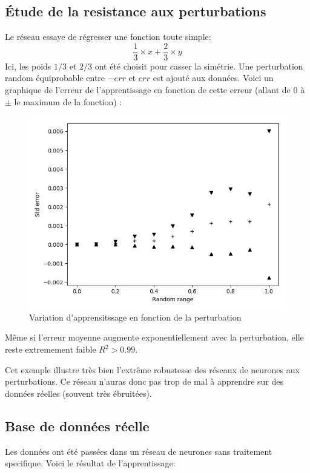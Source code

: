 \subsection{Étude de la resistance aux perturbations}\label{subsec:random}
Le réseau essaye de régresser une fonction toute simple:
\begin{equation}
    \frac{1}{3} \times x + \frac{2}{3} \times y
\end{equation}
Ici, les poids $1/3$ et $2/3$ ont été choisit pour casser la simétrie.
Une perturbation random équiprobable entre $-err$ et $err$ est ajouté aux données.
Voici un graphique de l'erreur de l'apprentissage en fonction de cette erreur
(allant de $0$ à $\pm$ le maximum de la fonction) :
\begin{figure}[H]
    \center
    \includegraphics[height=\moyen]{pict/random.png}
	\caption{Variation d'apprensitssage en fonction de la perturbation}
	\label{fig:obj2tiers1}
\end{figure}

Même si l'erreur moyenne augmente exponentiellement avec la perturbation,
elle reste extremement faible $R^2 > 0.99$.

Cet exemple illustre très bien l'extrême robustesse des réseaux de neurones aux perturbations.
Ce réseau n'auras donc pas trop de mal à apprendre sur des données réelles (souvent très ébruitées).


\subsection{Base de données réelle}\label{subsec:real}
Les données ont été passées dans un réseau de neurones sans traitement specifique.
Voici le résultat de l'apprentissage:

